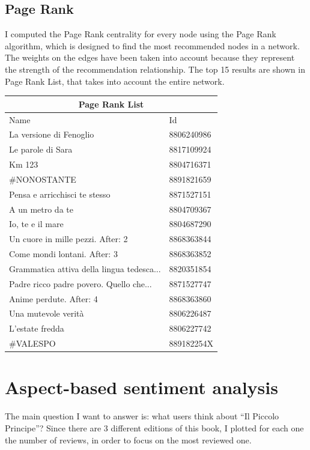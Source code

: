 \documentclass[a4paper,12pt]{article}
\begin{document}
\subsection{Page Rank}
I computed the Page Rank centrality for every node using the Page Rank algorithm, which is designed to find the most recommended nodes in a network. The weights on the edges have been taken into account because they represent the strength of the recommendation relationship. The top 15 results are shown in Page Rank List, that takes into account the
entire network.

\begin{table}[H]
	\centering
	\begin{tabular}{|l|l|}
		\hline
		\multicolumn{2}{|c|}{Page Rank List}                   \\ \hline
		Name                                      & Id         \\ \hline
		La versione di Fenoglio             & 8806240986 \\
		Le parole di Sara             & 8817109924 \\
		Km 123             & 8804716371 \\
		\#NONOSTANTE             & 8891821659 \\
		Pensa e arricchisci te stesso             & 8871527151 \\
		A un metro da te                          & 8804709367 \\
		Io, te e il mare                          & 8804687290 \\
		Un cuore in mille pezzi. After: 2         & 8868363844 \\
		Come mondi lontani. After: 3              & 8868363852 \\
		Grammatica attiva della lingua tedesca... & 8820351854 \\
		Padre ricco padre povero. Quello che...   & 8871527747 \\
		Anime perdute. After: 4                   & 8868363860 \\
		Una mutevole verità                       & 8806226487 \\
		L'estate fredda                           & 8806227742 \\
		\#VALESPO                                 & 889182254X \\
		\hline
	\end{tabular}
\end{table}

\newpage

\section{Aspect-based sentiment analysis}
The main question I want to answer is: what users think about “Il Piccolo Principe”? 
Since there are 3 different editions of  this book, I plotted for each one the number of reviews, in order to focus on the most reviewed one.
\end{document}
